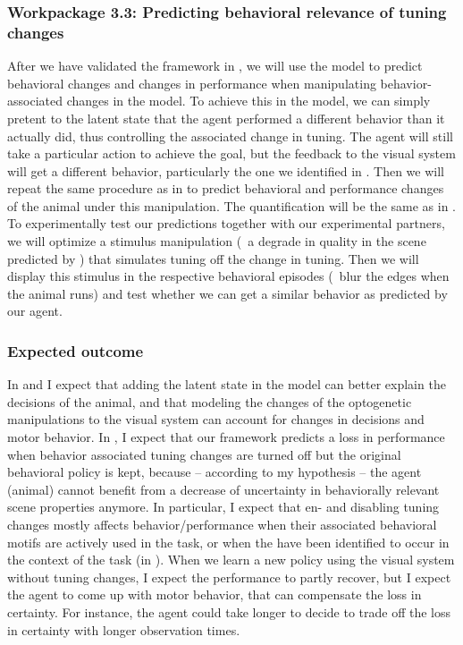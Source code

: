 \documentclass[B2,COG]{ercgrant}
\begin{document}
\subsubsection{Workpackage 3.3: Predicting behavioral relevance of tuning changes\hfill{}}

After we have validated the framework in , we will use the model to predict behavioral changes and changes in performance when manipulating behavior-associated changes in the model. 
To achieve this in the model, we can simply pretent to the latent state that the agent performed a different behavior than it actually did, thus controlling the associated change in tuning. 
The agent will still take a particular action to achieve the goal, but the feedback to the visual system will get a different behavior, particularly the one we identified in .
Then we will repeat the same procedure as in  to predict behavioral and performance changes of the animal under this manipulation. 
The quantification will be the same as in .
To experimentally test our predictions together with our experimental partners, we will optimize a stimulus manipulation (\eg~a degrade in quality in the scene predicted by ) that simulates tuning off the change in tuning. 
Then we will display this stimulus in the respective behavioral episodes (\eg~blur the edges when the animal runs) and test whether we can get a similar behavior as predicted by our agent.

\subsubsection{Expected outcome} 
In  and  I expect that adding the latent state in the model can better explain the decisions of the animal, and that modeling the changes of the optogenetic manipulations to the visual system can account for changes in decisions and motor behavior. 
In , I expect that our framework predicts a loss in performance when behavior associated tuning changes are turned off but the original behavioral policy is kept, because -- according to my hypothesis -- the agent (animal) cannot benefit from a decrease of uncertainty in behaviorally relevant scene properties anymore. 
In particular, I expect that en- and disabling tuning changes mostly affects behavior/performance when their associated behavioral motifs are actively used in the task, or when the have been identified to occur in the context of the task (in ).
When we learn a new policy using the visual system without tuning changes, I expect the performance to partly recover, but I expect the agent to come up with motor behavior, that can compensate the loss in certainty. 
For instance, the agent could take longer to decide to trade off the loss in certainty with longer observation times. 
\end{document}
